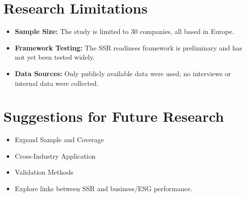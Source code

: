 \section{Research Limitations}

\begin{itemize}
    \item \textbf{Sample Size:}  
    The study is limited to 30 companies, all based in Europe.

    \item \textbf{Framework Testing:}  
    The SSR readiness framework is preliminary and has not yet been tested widely.

    \item \textbf{Data Sources:}  
    Only publicly available data were used; no interviews or internal data were collected.
\end{itemize}

\section{Suggestions for Future Research}

\begin{itemize}
    \item Expand Sample and Coverage  
    \item Cross-Industry Application 
    \item Validation Methods
    \item Explore links between SSR and business/ESG performance.
\end{itemize}
